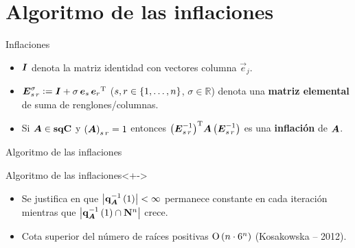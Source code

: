 \documentclass[spanish]{beamer}
\begin{document}
\section{Algoritmo de las inflaciones}
\begin{frame}{Inflaciones}
  \begin{definitions}
    \begin{itemize}[<+->]
      \item $\boldsymbol{I}$ denota la matriz identidad con vectores columna 
      $\vec{e}_j$.
      \item $\boldsymbol{E}_{{s} \, {r}}^{\sigma} \mathrel{\mathop:}= \boldsymbol{I} + \sigma \, \boldsymbol{e}_s \, 
      {\boldsymbol{e}_r}^{\operatorname{T}}$ ($s, r \in \left\{{1, \ldots, n}\right\}$, $\sigma \in 
      \mathbb{R}$) denota una \textbf{matriz elemental} de suma de renglones/columnas.
      \item Si $\boldsymbol{A} \in \mathbf{sqC}$ y $\left({\boldsymbol{A}}\right)_{{s}\,{r}} = 1$ entonces 
      ${\left(\boldsymbol{E}_{{s} \, {r}}^{-1}\right)}^{\operatorname{T}} \boldsymbol{A} 
      \left(\boldsymbol{E}_{{s} \, {r}}^{-1}\right)$ es una \textbf{inflación} de $\boldsymbol{A}$.
    \end{itemize}
  \end{definitions}
\end{frame}

\begin{frame}{Algoritmo de las inflaciones}
  \begin{block}{Algoritmo de las inflaciones}<+->
    \begin{algorithm}[H]
    \end{algorithm}
  \end{block}
  \begin{itemize}[<+->]
    \item Se justifica en que $\left|{\mathbf{q}_{\boldsymbol{A}}^{-1}\left(1\right)}\right| < 
    \infty$ permanece constante en cada iteración mientras que 
    $\left|{\mathbf{q}_{\boldsymbol{A}}^{-1}\left(1\right)\cap\mathbf{N}^n}\right|$ crece.
    \item Cota superior del número de raíces positivas $\operatorname{O}\left( n \cdot 6^{n} \right)$ (Kosakowska -- 2012).
  \end{itemize}
\end{frame}
\end{document}
